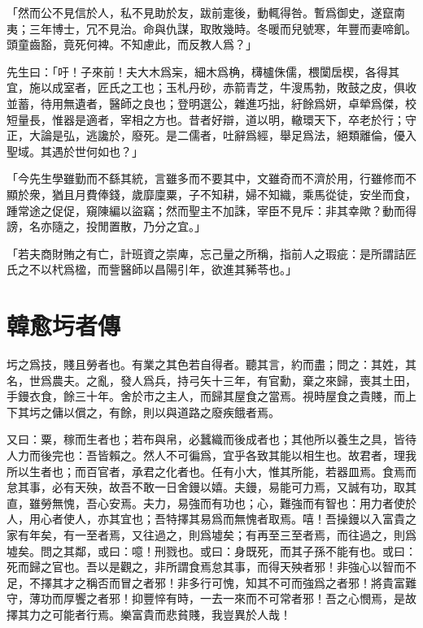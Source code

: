 「然而公不見信於人，私不見助於友，跋前疐後，動輒得咎。暫爲御史，遂竄南夷；三年博士，冗不見治。命與仇謀，取敗幾時。冬暖而兒號寒，年豐而妻啼飢。頭童齒豁，竟死何裨。不知慮此，而反教人爲？」

先生曰：「吁！子來前！夫大木爲杗，細木爲桷，欂櫨侏儒，椳闑扂楔，各得其宜，施以成室者，匠氏之工也；玉札丹砂，赤箭青芝，牛溲馬勃，敗鼓之皮，俱收並蓄，待用無遺者，醫師之良也；登明選公，雜進巧拙，紆餘爲妍，卓犖爲傑，校短量長，惟器是適者，宰相之方也。昔者好辯，道以明，轍環天下，卒老於行；守正，大論是弘，逃讒於，廢死。是二儒者，吐辭爲經，舉足爲法，絕類離倫，優入聖域。其遇於世何如也？」

「今先生學雖勤而不{繇}其統，言雖多而不要其中，文雖奇而不濟於用，行雖修而不顯於衆，猶且月費俸錢，歲靡廩粟，子不知耕，婦不知織，乘馬從徒，安坐而食，踵常途之促促，窺陳編以盜竊；然而聖主不加誅，宰臣不見斥：非其幸歟？動而得謗，名亦隨之，投閒置散，乃分之宜。」%

「若夫商財賄之有亡，計班資之崇庳，忘己量之所稱，指前人之瑕疵：是所謂詰匠氏之不以杙爲楹，而訾醫師以昌陽引年，欲進其豨苓也。」

\section[圬者王承福傳\quad{\small 韓愈}]{{\normalsize 韓愈}\quad 圬者傳}
圬之爲技，賤且勞者也。有業之其色若自得者。聽其言，約而盡；問之：其姓，其名，世爲農夫。之亂，發人爲兵，持弓矢十三年，有官勳，棄之來歸，喪其土田，手鏝衣食，餘三十年。舍於市之主人，而歸其屋食之當焉。視時屋食之貴賤，而上下其圬之傭以償之，有餘，則以與道路之廢疾餓者焉。

又曰：粟，稼而生者也；若布與帛，必蠶織而後成者也；其他所以養生之具，皆待人力而後完也：吾皆賴之。然人不可徧爲，宜乎各致其能以相生也。故君者，理我所以生者也；而百官者，承君之化者也。任有小大，惟其所能，若器皿焉。食焉而怠其事，必有天殃，故吾不敢一日舍鏝以嬉。夫鏝，易能可力焉，又誠有功，取其直，雖勞無愧，吾心安焉。夫力，易強而有功也；心，難強而有智也：用力者使於人，用心者使人，亦其宜也；吾特擇其易爲而無愧者取焉。嘻！吾操鏝以入富貴之家有年矣，有一至者焉，又往過之，則爲墟矣；有再至三至者焉，而往過之，則爲墟矣。問之其鄰，或曰：噫！刑戮也。或曰：身既死，而其子孫不能有也。或曰：死而歸之官也。吾以是觀之，非所謂食焉怠其事，而得天殃者邪！非強心以智而不足，不擇其才之稱否而冒之者邪！非多行可愧，知其不可而強爲之者邪！將貴富難守，薄功而厚饗之者邪！抑豐悴有時，一去一來而不可常者邪！吾之心憫焉，是故擇其力之可能者行焉。樂富貴而悲貧賤，我豈異於人哉！

